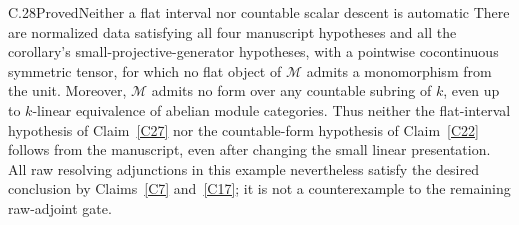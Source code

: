 \begin{claim}{C.28}{Proved}{Neither a flat interval nor countable scalar descent is automatic}\label{C28}
There are normalized data satisfying all four manuscript hypotheses and all the corollary's small-projective-generator hypotheses, with a pointwise cocontinuous symmetric tensor, for which no flat object of $\mathcal M$ admits a monomorphism from the unit. Moreover, $\mathcal M$ admits no form over any countable subring of $k$, even up to $k$-linear equivalence of abelian module categories. Thus neither the flat-interval hypothesis of Claim~\ref{C27} nor the countable-form hypothesis of Claim~\ref{C22} follows from the manuscript, even after changing the small linear presentation. All raw resolving adjunctions in this example nevertheless satisfy the desired conclusion by Claims~\ref{C7} and~\ref{C17}; it is not a counterexample to the remaining raw-adjoint gate.
\end{claim}
